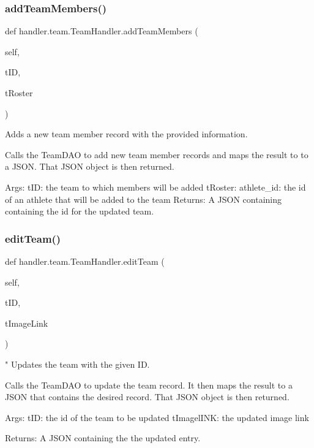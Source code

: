 \subsubsection{\texorpdfstring{add\+Team\+Members()}{addTeamMembers()}}
{\footnotesize\ttfamily def handler.\+team.\+Team\+Handler.\+add\+Team\+Members (\begin{DoxyParamCaption}\item[{}]{self,  }\item[{}]{t\+ID,  }\item[{}]{t\+Roster }\end{DoxyParamCaption})}

\begin{DoxyVerb}Adds a new team member record with the provided information.

Calls the TeamDAO to add new team member records and maps the result to
to a JSON. That JSON object 
is then returned.

Args:
    tID: the team to which members will be added
    tRoster:
athlete_id: the id of an athlete that will be added to the team
Returns:
    A JSON containing containing the id for the updated team.
\end{DoxyVerb}
 \mbox{\label{classhandler_1_1team_1_1_team_handler_a9fc42144b674bd9901dd1100cd8e389e}} 
\subsubsection{\texorpdfstring{edit\+Team()}{editTeam()}}
{\footnotesize\ttfamily def handler.\+team.\+Team\+Handler.\+edit\+Team (\begin{DoxyParamCaption}\item[{}]{self,  }\item[{}]{t\+ID,  }\item[{}]{t\+Image\+Link }\end{DoxyParamCaption})}

\begin{DoxyVerb}"
Updates the team with the given ID.

Calls the TeamDAO to update the team record. It then
maps the result to a JSON that contains the desired record. That JSON 
object is then returned.

Args:
    tID: the id of the team to be updated
    tImagelINK: the updated image link
    
Returns:
    A JSON containing the the updated entry.
\end{DoxyVerb}
 \mbox{\label{classhandler_1_1team_1_1_team_handler_afa5cdac4a2bf859601108dd7e3f7a045}} 
